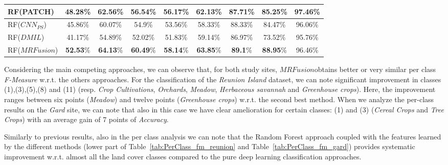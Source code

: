 \documentclass[journal]{IEEEtran}
\newcommand{\method}{$MRFusion$}
\begin{document}
\begin{table*}[!ht]
\begin{tabular}{|l||c|c|c|c|c|c|c|c|}
RF(PATCH) & 48.28\% & 62.56\% & 56.54\% & 56.17\% & 62.13\% & 87.71\% & 85.25\% & \textbf{97.46}\% \\ \hline
RF($CNN_{PS}$) & 45.86\% & 60.07\% & 54.9\% & 53.56\% & 58.33\% & 88.33\% & 84.47\% & 96.06\% \\ \hline
RF($DMIL$) & 41.17\% & 54.89\% & 52.02\% & 51.83\% & 59.14\% & 86.97\% & 73.52\% & 95.76\% \\ \hline
RF(\method) & \textbf{52.53}\% & \textbf{64.13}\% & \textbf{60.49}\% & \textbf{58.14}\% & \textbf{63.85}\% & \textbf{89.1}\% & \textbf{88.95}\% & 96.46\% \\ \hline
\hline
\end{tabular}
\caption{Gard Dataset\label{tab:PerClass_fm_gard}}
\end{table*}Considering the main competing approaches, we can observe that, for both study sites, \method obtains better or very similar per class \textit{F-Measure} w.r.t. the others approaches. For the classification of the \textit{Reunion Island} dataset, we can note significant improvement in classes (1),(3),(5),(8) and (11) (resp. \textit{Crop Cultivations}, \textit{Orchards}, \textit{Meadow}, \textit{Herbaceous savannah} and \textit{Greenhouse crops}). Here, the improvement ranges between six points (\textit{Meadow}) and twelve points (\textit{Greenhouse crops}) w.r.t. the second best method. When we analyze the per-class results on the \textit{Gard} site, we can note that also in this case we have clear amelioration for certain classes: (1) and (3) (\textit{Cereal Crops} and \textit{Tree Crops}) with an average gain of 7 points of \textit{Accuracy}.

Similarly to previous results, also in the per class analysis we can note that the Random Forest approach coupled with the features learned by the different methods (lower part of Table~\ref{tab:PerClass_fm_reunion} and Table~\ref{tab:PerClass_fm_gard}) provides systematic improvement w.r.t. almost all the land cover classes compared to the pure deep learning classification approaches.
\end{document}
